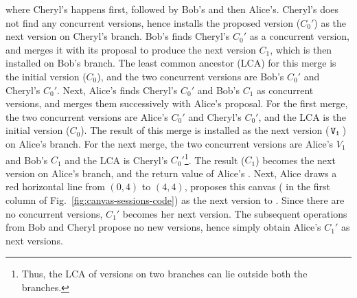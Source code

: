 where Cheryl's  happens first, followed by Bob's and then
Alice's.  Cheryl's  does not find any concurrent versions,
hence installs the proposed version ($C_0'$) as the next version on
Cheryl's branch. Bob's  finds Cheryl's $C_0'$ as a concurrent
version, and merges it with its proposal to produce the next version
$C_1$, which is then installed on Bob's branch.  The least common
ancestor (LCA) for this merge is the initial version ($C_0$), and the
two concurrent versions are Bob's $C_0'$ and Cheryl's $C_0'$. Next,
Alice's  finds Cheryl's $C_0'$ and Bob's $C_1$ as concurrent
versions, and merges them successively with Alice's proposal. For the
first merge, the two concurrent versions are Alice's $C_0'$ and
Cheryl's $C_0'$, and the LCA is the initial version ($C_0$). The
result of this merge is installed as the next version ($\,{\tt V_1}\,$) on
Alice's branch. For the next merge, the two concurrent versions are
Alice's $V_1$ and Bob's $C_1$ and the LCA is Cheryl's
$C_0'$\footnote{Thus, the LCA of versions on two branches can lie
  outside both the branches.}. The result ($C_1$) becomes the next
version on Alice's branch, and the return value of Alice's .
Next, Alice draws a red horizontal line from $(0,4)$ to $(4,4)$,
proposes this canvas ( in the first column of
Fig.~\ref{fig:canvas-sessions-code}) as the next version to .
Since there are no concurrent versions, $C_1'$ becomes her next
version. The subsequent  operations from Bob and Cheryl
propose no new versions, hence simply obtain Alice's $C_1'$ as next
versions.
